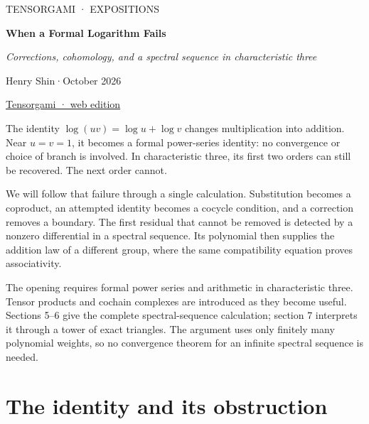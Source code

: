 \documentclass[11pt,letterpaper]{article}
\begin{document}
\color{ink}
\thispagestyle{empty}
{\sffamily\small\textcolor{accent}{TENSORGAMI · EXPOSITIONS}\par}
\vspace{.6em}
{\LARGE\bfseries When a Formal Logarithm Fails\par}
\vspace{.4em}
{\large\itshape Corrections, cohomology, and a spectral sequence in characteristic three\par}
\vspace{.65em}
{Henry Shin\hspace{.6em}·\hspace{.6em}October 2026\par}
\vspace{.3em}
{\small\href{https://tensorgami.com/notes/when-a-formal-logarithm-fails.html}{Tensorgami · web edition}\par}
\vspace{.6em}

The identity \(
\log(uv)=\log u+\log v
\) changes multiplication into addition. Near \(
u=v=1
\), it becomes a formal power-series identity: no convergence or choice of branch is involved. In characteristic three, its first two orders can still be recovered. The next order cannot.


We will follow that failure through a single calculation. Substitution becomes a coproduct, an attempted identity becomes a cocycle condition, and a correction removes a boundary. The first residual that cannot be removed is detected by a nonzero differential in a spectral sequence. Its polynomial then supplies the addition law of a different group, where the same compatibility equation proves associativity.


The opening requires formal power series and arithmetic in characteristic three. Tensor products and cochain complexes are introduced as they become useful. Sections 5–6 give the complete spectral-sequence calculation; section 7 interprets it through a tower of exact triangles. The argument uses only finitely many polynomial weights, so no convergence theorem for an infinite spectral sequence is needed.




\clearpage\thispagestyle{plain}\tableofcontents\clearpage
\section{The identity and its obstruction}\label{sec:identity-and-obstruction}\hypertarget{identity-and-obstruction}{}
\end{document}
